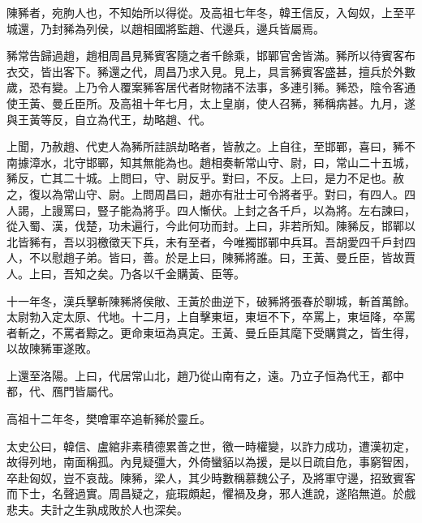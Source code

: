 陳豨者，宛朐人也，不知始所以得從。及高祖七年冬，韓王信反，入匈奴，上至平城還，乃封豨為列侯，以趙相國將監趙、代邊兵，邊兵皆屬焉。

豨常告歸過趙，趙相周昌見豨賓客隨之者千餘乘，邯鄲官舍皆滿。豨所以待賓客布衣交，皆出客下。豨還之代，周昌乃求入見。見上，具言豨賓客盛甚，擅兵於外數歲，恐有變。上乃令人覆案豨客居代者財物諸不法事，多連引豨。豨恐，陰令客通使王黃、曼丘臣所。及高祖十年七月，太上皇崩，使人召豨，豨稱病甚。九月，遂與王黃等反，自立為代王，劫略趙、代。

上聞，乃赦趙、代吏人為豨所詿誤劫略者，皆赦之。上自往，至邯鄲，喜曰，豨不南據漳水，北守邯鄲，知其無能為也。趙相奏斬常山守、尉，曰，常山二十五城，豨反，亡其二十城。上問曰，守、尉反乎。對曰，不反。上曰，是力不足也。赦之，復以為常山守、尉。上問周昌曰，趙亦有壯士可令將者乎。對曰，有四人。四人謁，上謾罵曰，豎子能為將乎。四人慚伏。上封之各千戶，以為將。左右諫曰，從入蜀、漢，伐楚，功未遍行，今此何功而封。上曰，非若所知。陳豨反，邯鄲以北皆豨有，吾以羽檄徵天下兵，未有至者，今唯獨邯鄲中兵耳。吾胡愛四千戶封四人，不以慰趙子弟。皆曰，善。於是上曰，陳豨將誰。曰，王黃、曼丘臣，皆故賈人。上曰，吾知之矣。乃各以千金購黃、臣等。

十一年冬，漢兵擊斬陳豨將侯敞、王黃於曲逆下，破豨將張春於聊城，斬首萬餘。太尉勃入定太原、代地。十二月，上自擊東垣，東垣不下，卒罵上，東垣降，卒罵者斬之，不罵者黥之。更命東垣為真定。王黃、曼丘臣其麾下受購賞之，皆生得，以故陳豨軍遂敗。

上還至洛陽。上曰，代居常山北，趙乃從山南有之，遠。乃立子恒為代王，都中都，代、鴈門皆屬代。

高祖十二年冬，樊噲軍卒追斬豨於靈丘。

太史公曰，韓信、盧綰非素積德累善之世，徼一時權變，以詐力成功，遭漢初定，故得列地，南面稱孤。內見疑彊大，外倚蠻貊以為援，是以日疏自危，事窮智困，卒赴匈奴，豈不哀哉。陳豨，梁人，其少時數稱慕魏公子，及將軍守邊，招致賓客而下士，名聲過實。周昌疑之，疵瑕頗起，懼禍及身，邪人進說，遂陷無道。於戲悲夫。夫計之生孰成敗於人也深矣。